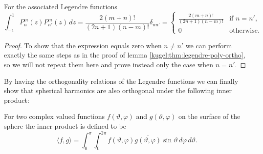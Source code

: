 \begin{lemma} For the associated Legendre functions
  \label{kugel:thm:associated-legendre-ortho}
  \begin{equation*}
    \int_{-1}^1 P^m_n(z) P^{m}_{n'}(z) \, dz
    = \frac{2(m + n)!}{(2n + 1)(n - m)!} \delta_{nn'}
    = \begin{cases}
      \frac{2(m + n)!}{(2n + 1)(n - m)!}
        & \text{if } n = n', \\
      0 & \text{otherwise}.
    \end{cases}
  \end{equation*}
\end{lemma}
\begin{proof}
  To show that the expression equals zero when $n \neq n'$ we can perform
  exactly the same steps as in the proof of lemma
  \ref{kugel:thm:legendre-poly-ortho}, so we will not repeat them here and prove
  instead only the case when $n = n'$.
\end{proof}

By having the orthogonality relations of the Legendre functions we can finally
show that spherical harmonics are also orthogonal under the following inner
product:

\begin{definition}
  \label{kugel:def:inner-product-s2}
  For two complex valued functions $f(\vartheta, \varphi)$ and $g(\vartheta,
  \varphi)$ on the surface of the sphere the inner product is defined to be
  \begin{equation*}
    \langle f, g \rangle
    = \int_{0}^\pi \int_0^{2\pi}
      f(\vartheta, \varphi) \overline{g(\vartheta, \varphi)}
      \sin \vartheta \, d\varphi \, d\vartheta.
  \end{equation*}
\end{definition}


